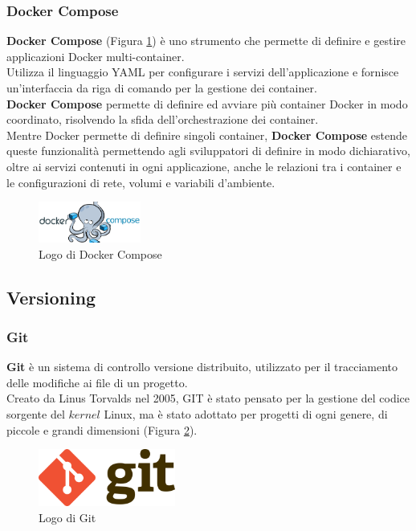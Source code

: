 \subsubsection{Docker Compose}
\textbf{Docker Compose} (Figura \ref{fig:docker_compose}) è uno strumento che permette di definire e gestire applicazioni \gls{Docker}{} multi-container. \\
Utilizza il linguaggio YAML per configurare i servizi dell'applicazione e fornisce un'interfaccia da riga di comando per la gestione dei \gls{container}{}.\\
\textbf{Docker Compose} permette di definire ed avviare più \gls{container}{} \gls{Docker}{} in modo coordinato, risolvendo 
la sfida dell'orchestrazione dei \gls{container}{}.\\
Mentre \gls{Docker}{} permette di definire singoli \gls{container}{}, \textbf{Docker Compose} estende queste funzionalità permettendo agli sviluppatori 
di definire in modo dichiarativo, oltre ai servizi contenuti in ogni applicazione, anche le relazioni tra i \gls{container}{} e le configurazioni di rete, volumi e variabili d'ambiente.\\
\begin{figure}[h]
    \centering
    \includegraphics[width=0.3\textwidth]{images/tecnologie/logo_docker_compose.png}
    \caption{Logo di Docker Compose}
    \label{fig:docker_compose}
\end{figure}
\pagebreak
\subsection{Versioning}
\subsubsection{Git}
\textbf{Git} è un sistema di controllo versione distribuito, utilizzato per il tracciamento delle modifiche ai file di un progetto.\\ 
Creato da Linus Torvalds nel 2005, GIT è stato pensato per la gestione del codice sorgente del $kernel$ Linux, ma è stato adottato 
per progetti di ogni genere, di piccole e grandi dimensioni (Figura \ref{fig:git}).\\
\begin{figure}[h]
    \centering
    \includegraphics[width=0.4\textwidth]{images/tecnologie/logo_git.png}
    \caption{Logo di Git}
    \label{fig:git}
\end{figure}

